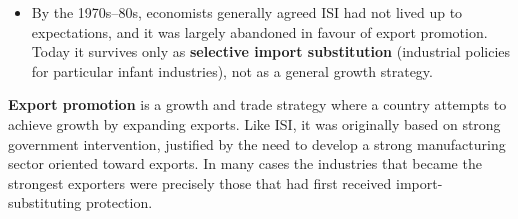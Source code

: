 \documentclass[a4paper,12pt]{article}
\newcommand{\needbold}[1]{\textcolor{red!70!black}{\textbf{#1}}}
\begin{document}
\begin{itemize}
\begin{itemize}
    \item \textbf{Limits to long run growth}: many protected firms never grew up into efficient low-cost producers; firms that should have closed down were kept alive while potentially successful ones were not created.
  \end{itemize}
  \item By the 1970s--80s, economists generally agreed ISI had not lived up to expectations, and it was largely abandoned in favour of export promotion. Today it survives only as \textbf{selective import substitution} (industrial policies for particular infant industries), not as a general growth strategy.
\end{itemize}
\needbold{Export promotion} is a growth and trade strategy where a country attempts to achieve growth by expanding exports. Like ISI, it was originally based on strong government intervention, justified by the need to develop a strong manufacturing sector oriented toward exports. In many cases the industries that became the strongest exporters were precisely those that had first received import-substituting protection.
\end{document}

